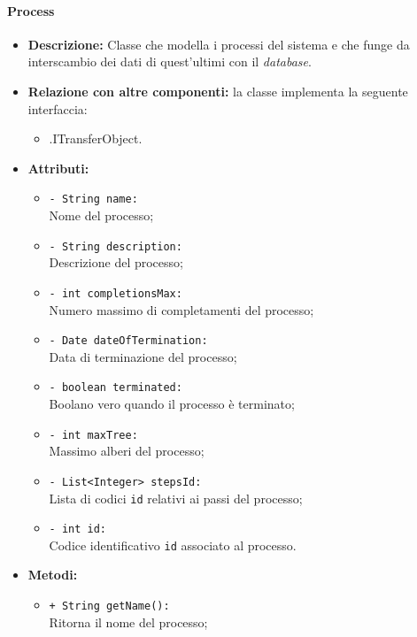 \paragraph{Process}
\label{botprocess}
\begin{flushleft}
\begin{itemize}
\item \textbf{Descrizione:} Classe che modella i processi del sistema e che funge da interscambio dei dati di quest'ultimi con il \textit{database}.
\item \textbf{Relazione con altre componenti:} la classe implementa la seguente interfaccia:
		\begin{itemize}
			\item \smodel{}.ITransferObject.
		\end{itemize}
\item \textbf{Attributi:}
\begin{sloppypar}
\begin{itemize}
\item \texttt{- String name:}\\ Nome del processo;
\item \texttt{- String description:}\\ Descrizione del processo;
\item \texttt{- int completionsMax:}\\ Numero massimo di completamenti del processo;
\item \texttt{- Date dateOfTermination:}\\ Data di terminazione del processo;
\item \texttt{- boolean terminated:}\\ Boolano vero quando il processo è terminato;
\item \texttt{- int maxTree:}\\ Massimo alberi del processo;
\item \texttt{- List<Integer> stepsId:}\\ Lista di codici \texttt{id} relativi ai passi del processo;
\item \texttt{- int id:}\\ Codice identificativo \texttt{id} associato al processo.
\end{itemize}
\end{sloppypar}
\item \textbf{Metodi:}
\begin{sloppypar}
\begin{itemize}
\item \texttt{+ String getName():}\\ Ritorna il nome del processo;

\end{itemize}
\end{sloppypar}
\end{itemize}
\end{flushleft}
